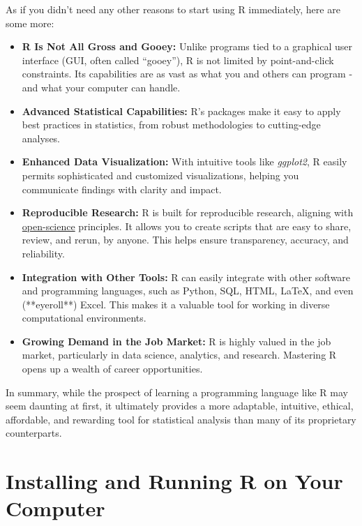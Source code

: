 \noindent As if you didn't need any other reasons to start using R immediately, here are some more:

\begin{itemize}

    \item \textbf{R Is Not All Gross and Gooey:} Unlike programs tied to a graphical user interface (GUI, often called ``gooey''), R is not limited by point-and-click constraints. Its capabilities are as vast as what you and others can program - and what your computer can handle.
    
    \item \textbf{Advanced Statistical Capabilities:} R's packages make it easy to apply best practices in statistics, from robust methodologies to cutting-edge analyses.
    
    \item \textbf{Enhanced Data Visualization:} With intuitive tools like \textit{ggplot2}, R easily permits sophisticated and customized visualizations, helping you communicate findings with clarity and impact.
    
    \item \textbf{Reproducible Research:} R is built for reproducible research, aligning with \href{https://unesdoc.unesco.org/ark:/48223/pf0000379949}{open-science} principles. It allows you to create scripts that are easy to share, review, and rerun, by anyone. This helps ensure transparency, accuracy, and reliability.
    
    \item \textbf{Integration with Other Tools:} R can easily integrate with other software and programming languages, such as Python, SQL, HTML, \LaTeX, and even (**eyeroll**) Excel. This makes it a valuable tool for working in diverse computational environments.
    
    \item \textbf{Growing Demand in the Job Market:} R is highly valued in the job market, particularly in data science, analytics, and research. Mastering R opens up a wealth of career opportunities.
    
\end{itemize}

In summary, while the prospect of learning a programming language like R may seem daunting at first, it ultimately provides a more adaptable, intuitive, ethical, affordable, and rewarding tool for statistical analysis than many of its proprietary counterparts.

\section{Installing and Running R on Your Computer}

